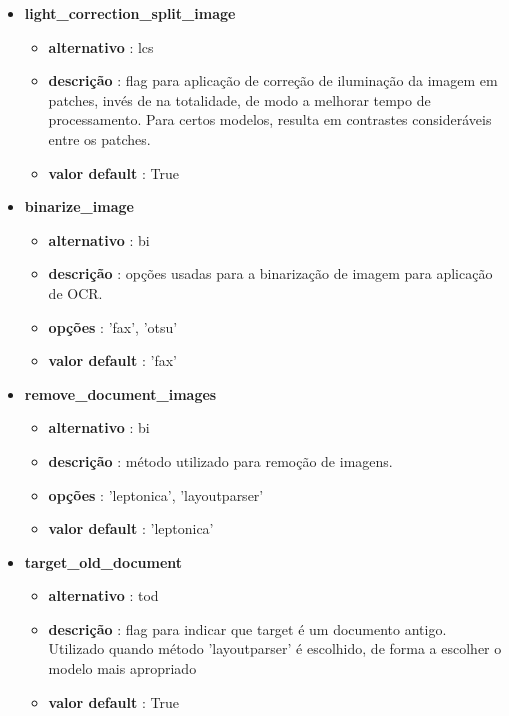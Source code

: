 \begin{itemize}
	\item \textbf{light\_correction\_split\_image}
	\begin{itemize}\setlength\itemsep{-0.5em}
		\vspace{-1em}
		\item \textbf{alternativo} : lcs
		\item \textbf{descrição} : flag para aplicação de correção de iluminação da imagem em patches, invés de na totalidade, de modo a melhorar tempo de processamento. Para certos modelos, resulta em contrastes consideráveis entre os patches.
		\item \textbf{valor default} : True
	\end{itemize}
	
	\item \textbf{binarize\_image}
		\begin{itemize}\setlength\itemsep{-0.5em}
			\vspace{-1em}
			\item \textbf{alternativo} : bi
			\item \textbf{descrição} : opções usadas para a binarização de imagem para aplicação de OCR.
			\item \textbf{opções} : 'fax', 'otsu'
			\item \textbf{valor default} : 'fax'
		\end{itemize}
	
	\item \textbf{remove\_document\_images}
		\begin{itemize}\setlength\itemsep{-0.5em}
			\vspace{-1em}
			\item \textbf{alternativo} : bi
			\item \textbf{descrição} : método utilizado para remoção de imagens.
			\item \textbf{opções} : 'leptonica', 'layoutparser'
			\item \textbf{valor default} : 'leptonica'
		\end{itemize}
	
	\item \textbf{target\_old\_document}
		\begin{itemize}\setlength\itemsep{-0.5em}
			\vspace{-1em}
			\item \textbf{alternativo} : tod
			\item \textbf{descrição} : flag para indicar que target é um documento antigo. Utilizado quando método 'layoutparser' é escolhido, de forma a escolher o modelo mais apropriado
			\item \textbf{valor default} : True
		\end{itemize}
	

\end{itemize}
